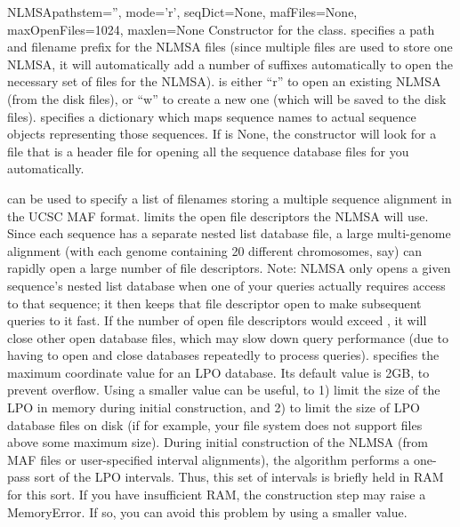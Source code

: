 \documentclass{howto}
\begin{document}
\begin{funcdesc}{NLMSA}{pathstem='', mode='r', seqDict=None, mafFiles=None, maxOpenFiles=1024, maxlen=None}
  Constructor for the class.   specifies a path and filename prefix for
  the NLMSA files (since multiple files are used to store one NLMSA, it will automatically add a
  number of suffixes automatically to open the necessary set of files for the NLMSA).
   is either ``r'' to open an existing NLMSA (from the  disk files), 
  or ``w'' to create a new one (which will be saved to the  disk files).
   specifies a dictionary which maps sequence names to actual sequence
  objects representing those sequences.  If  is None, the constructor
  will look for a file  that is a 
  header file for opening all the sequence database files for you automatically.

   can be used to specify a list of
  filenames storing a multiple sequence alignment in the UCSC MAF format.
   limits the open file descriptors the NLMSA will use.  Since
  each sequence has a separate nested list database file, a large multi-genome alignment
  (with each genome containing 20 different chromosomes, say) can rapidly open a large
  number of file descriptors.  Note: NLMSA only opens a given sequence's nested list database
  when one of your queries actually requires access to that sequence; it then
  keeps that file descriptor open to make subsequent queries to it fast.  If the number
  of open file descriptors would exceed , it will close other open
  database files, which may slow down query performance (due to having to open and close
  databases repeatedly to process queries).  specifies the maximum coordinate
  value for an LPO database.  Its default value is 2GB, to prevent  overflow.
  Using a smaller value can be useful, to 1) limit the size of the LPO in memory
  during initial construction, and 2) to limit the size of LPO database files on disk
  (if for example, your file system does not support files above some maximum size).
  During initial construction of the NLMSA (from MAF files or user-specified interval
  alignments), the algorithm performs a one-pass sort of the LPO intervals.  Thus,
  this set of intervals is briefly held in RAM for this sort.  If you have insufficient
  RAM, the construction step may raise a MemoryError.  If so, you can avoid this problem
  by using a smaller  value.
\end{funcdesc}
\end{document}
